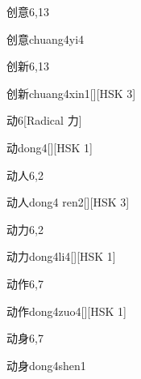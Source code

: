 \begin{entry}{创意}{6,13}
  \begin{phonetics}{创意}{chuang4yi4}
  \end{phonetics}
\end{entry}

\begin{entry}{创新}{6,13}
  \begin{phonetics}{创新}{chuang4xin1}[][HSK 3]
  \end{phonetics}
\end{entry}

\begin{entry}{动}{6}[Radical 力]
  \begin{phonetics}{动}{dong4}[][HSK 1]
  \end{phonetics}
\end{entry}

\begin{entry}{动人}{6,2}
  \begin{phonetics}{动人}{dong4 ren2}[][HSK 3]
  \end{phonetics}
\end{entry}

\begin{entry}{动力}{6,2}
  \begin{phonetics}{动力}{dong4li4}[][HSK 1]
  \end{phonetics}
\end{entry}

\begin{entry}{动作}{6,7}
  \begin{phonetics}{动作}{dong4zuo4}[][HSK 1]
  \end{phonetics}
\end{entry}

\begin{entry}{动身}{6,7}
  \begin{phonetics}{动身}{dong4shen1}
  \end{phonetics}
\end{entry}

